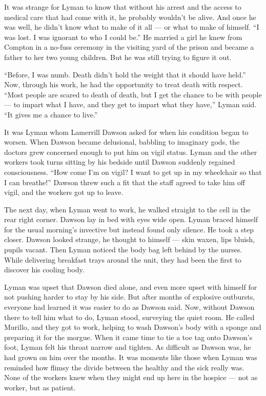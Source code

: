 It was strange for Lyman to know that without his arrest and the access
to medical care that had come with it, he probably wouldn't be alive.
And once he was well, he didn't know what to make of it all --- or what
to make of himself. ``I was lost. I was ignorant to who I could be.'' He
married a girl he knew from Compton in a no-fuss ceremony in the
visiting yard of the prison and became a father to her two young
children. But he was still trying to figure it out.

``Before, I was numb. Death didn't hold the weight that it should have
held.'' Now, through his work, he had the opportunity to treat death
with respect. ``Most people are scared to death of death, but I get the
chance to be with people --- to impart what I have, and they get to
impart what they have,'' Lyman said. ``It gives me a chance to live.''

It was Lyman whom Lamerrill Dawson asked for when his condition began to
worsen. When Dawson became delusional, babbling to imaginary gods, the
doctors grew concerned enough to put him on vigil status. Lyman and the
other workers took turns sitting by his bedside until Dawson suddenly
regained consciousness. ``How come I'm on vigil? I want to get up in my
wheelchair so that I can breathe!'' Dawson threw such a fit that the
staff agreed to take him off vigil, and the workers got up to leave.

The next day, when Lyman went to work, he walked straight to the cell in
the rear right corner. Dawson lay in bed with eyes wide open. Lyman
braced himself for the usual morning's invective but instead found only
silence. He took a step closer. Dawson looked strange, he thought to
himself --- skin waxen, lips bluish, pupils vacant. Then Lyman noticed
the body bag left behind by the nurses. While delivering breakfast trays
around the unit, they had been the first to discover his cooling body.

Lyman was upset that Dawson died alone, and even more upset with himself
for not pushing harder to stay by his side. But after months of
explosive outbursts, everyone had learned it was easier to do as Dawson
said. Now, without Dawson there to tell him what to do, Lyman stood,
surveying the quiet room. He called Murillo, and they got to work,
helping to wash Dawson's body with a sponge and preparing it for the
morgue. When it came time to tie a toe tag onto Dawson's foot, Lyman
felt his throat narrow and tighten. As difficult as Dawson was, he had
grown on him over the months. It was moments like those when Lyman was
reminded how flimsy the divide between the healthy and the sick really
was. None of the workers knew when they might end up here in the hospice
--- not as worker, but as patient.

